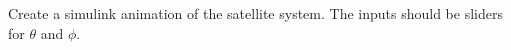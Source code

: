 
Create a simulink animation of the satellite system. The inputs should be sliders for $\theta$ and $\phi$.